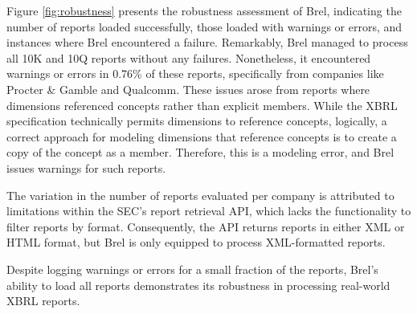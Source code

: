 Figure \ref{fig:robustness} presents the robustness assessment of Brel, 
indicating the number of reports loaded successfully, those loaded with warnings or errors, 
and instances where Brel encountered a failure. 
Remarkably, Brel managed to process all 10K and 10Q reports without any failures. 
Nonetheless, it encountered warnings or errors in 0.76\% of these reports, 
specifically from companies like Procter \& Gamble and Qualcomm. 
These issues arose from reports where dimensions referenced concepts rather than explicit members. 
While the XBRL specification technically permits dimensions to reference concepts, logically, 
a correct approach for modeling dimensions that reference concepts is to create a copy of the concept as a member. 
Therefore, this is a modeling error, and Brel issues warnings for such reports.

The variation in the number of reports evaluated per company is attributed to limitations within the SEC's report retrieval API, 
which lacks the functionality to filter reports by format. 
Consequently, the API returns reports in either XML or HTML format, but Brel is only equipped to process XML-formatted reports.

Despite logging warnings or errors for a small fraction of the reports, 
Brel's ability to load all reports demonstrates its robustness in processing real-world XBRL reports.
